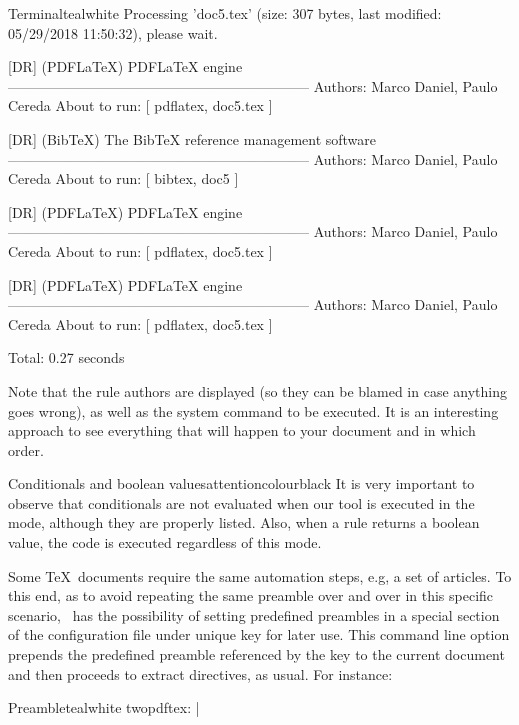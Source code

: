 \begin{description}
\begin{codebox}{Terminal}{teal}{\icnote}{white}
Processing 'doc5.tex' (size: 307 bytes, last modified: 05/29/2018
11:50:32), please wait.

[DR] (PDFLaTeX) PDFLaTeX engine
-----------------------------------------------------------------
Authors: Marco Daniel, Paulo Cereda
About to run: [ pdflatex, doc5.tex ]

[DR] (BibTeX) The BibTeX reference management software
-----------------------------------------------------------------
Authors: Marco Daniel, Paulo Cereda
About to run: [ bibtex, doc5 ]

[DR] (PDFLaTeX) PDFLaTeX engine
-----------------------------------------------------------------
Authors: Marco Daniel, Paulo Cereda
About to run: [ pdflatex, doc5.tex ]

[DR] (PDFLaTeX) PDFLaTeX engine
-----------------------------------------------------------------
Authors: Marco Daniel, Paulo Cereda
About to run: [ pdflatex, doc5.tex ]

Total: 0.27 seconds
\end{codebox}

Note that the rule authors are displayed (so they can be blamed in case anything goes wrong), as well as the system command to be executed. It is an interesting approach to see everything that will happen to your document and in which order.

\begin{messagebox}{Conditionals and boolean values}{attentioncolour}{\icattention}{black}
It is very important to observe that conditionals are not evaluated when our tool is executed in the  mode, although they are properly listed. Also, when a rule returns a boolean value, the code is executed regardless of this mode.
\end{messagebox}

\item[\describeopp{p}{preamble}{name}] Some \TeX\ documents require the same automation steps, e.g, a set of articles. To this end, as to avoid repeating the same preamble over and over in this specific scenario, \arara\ has the possibility of setting predefined preambles in a special section of the configuration file under unique key for later use. This command line option prepends the predefined preamble referenced by the  key to the current document and then proceeds to extract directives, as usual. For instance:

\begin{codebox}{Preamble}{teal}{\icnote}{white}
twopdftex: |
\end{codebox}


\end{description}
